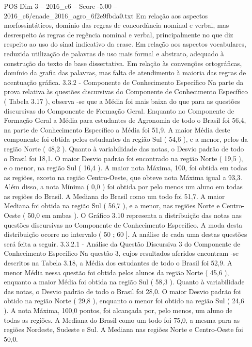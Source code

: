 \begin{textsample}{POS Dim 3 – 2016\_c6 – Score -5.00 – 2016\_c6/enade\_2016\_agro\_6f2e9fbda0.txt}
Em relação aos aspectos morfossintáticos, domínio das regras de concordância nominal e verbal, mas desrespeito às regras de regência nominal e verbal, principalmente no que diz respeito ao uso do sinal indicativo da crase.
Em relação aos aspectos vocabulares, reduzida utilização de palavras de uso mais formal e abstrato, adequado à construção do texto de base dissertativa.
Em relação às convenções ortográficas, domínio da grafia das palavras, mas falta de atendimento à maioria das regras de acentuação gráfica. 3.3.2 - Componente de Conhecimento Específico Na parte da prova relativa às questões discursivas do Componente de Conhecimento Específico ( Tabela 3.17 ), observa -se que a Média foi mais baixa do que para as questões discursivas do Componente de Formação Geral.
Enquanto no Componente de Formação Geral a Média para estudantes de Agronomia de todo o Brasil foi 56,4, na parte de Conhecimento Específico a Média foi 51,9.
A maior Média deste componente foi obtida pelos estudantes da região Sul ( 54,6 ), e a menor, pelos da região Norte ( 48,2 ).
Quanto à variabilidade das notas, o Desvio padrão de todo o Brasil foi 18,1.
O maior Desvio padrão foi encontrado na região Norte ( 19,5 ), e o menor, na região Sul ( 16,4 ).
A maior nota Máxima, 100, foi obtida em todas as regiões, exceto na região Centro-Oeste, que obteve nota Máxima igual a 93,3.
Além disso, a nota Mínima ( 0,0 ) foi obtida por pelo menos um aluno em todas as regiões do Brasil.
A Mediana do Brasil como um todo foi 51,7.
A maior Mediana foi obtida na região Sul ( 56,7 ), e a menor, nas regiões Norte e Centro-Oeste ( 50,0 em ambas ).
O Gráfico 3.10 representa a distribuição das notas nas questões discursivas no Componente de Conhecimento Específico.
A moda desta distribuição ocorre no intervalo ( 50 ; 60 ].
A análise de cada uma destas questões será feita a seguir. 3.3.2.1 - Análise da Questão Discursiva 3 do Componente de Conhecimento Específico Na questão 3, cujos resultados aferidos encontram -se descritos na Tabela 3.18, a Média dos estudantes de todo o Brasil foi 52,9.
A menor Média nessa questão foi obtida pelos alunos da região Norte ( 45,6 ), enquanto a maior Média foi obtida na região Sul ( 58,3 ).
Quanto à variabilidade das notas, o Desvio padrão de todo o Brasil foi 28,0.
O maior Desvio padrão foi obtido na região Norte ( 29,8 ), enquanto o menor foi obtido na região Sul ( 24,6 ).
A nota Máxima, 100,0 pontos, foi alcançada por, pelo menos, um aluno de todas as regiões.
A Mediana do Brasil como um todo foi 75,0, a mesma para as regiões Nordeste, Sudeste e Sul.
A Mediana nas regiões Norte e Centro-Oeste foi 50,0.

\end{textsample}
